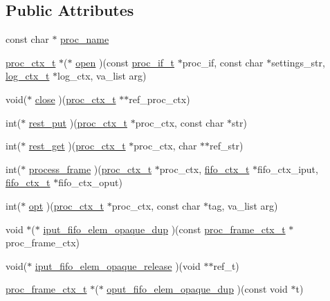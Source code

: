 \subsection*{Public Attributes}
\begin{DoxyCompactItemize}
\item 
const char $\ast$ \hyperlink{structproc__if__s_aa284f1d0bdde2fae0b51101f658430ee}{proc\+\_\+name}
\item 
\hyperlink{proc_8h_ae264f89be30fc03f5053bc16d58cba05}{proc\+\_\+ctx\+\_\+t} $\ast$($\ast$ \hyperlink{structproc__if__s_a34999576771394dfb721463c8455ba06}{open} )(const \hyperlink{proc_8h_a679816cf30e0b7a8f3e7464e67a6a844}{proc\+\_\+if\+\_\+t} $\ast$proc\+\_\+if, const char $\ast$settings\+\_\+str, \hyperlink{structlog__ctx__s}{log\+\_\+ctx\+\_\+t} $\ast$log\+\_\+ctx, va\+\_\+list arg)
\item 
void($\ast$ \hyperlink{structproc__if__s_af5971ac1d09d1c6ec3508c36fb286c19}{close} )(\hyperlink{proc_8h_ae264f89be30fc03f5053bc16d58cba05}{proc\+\_\+ctx\+\_\+t} $\ast$$\ast$ref\+\_\+proc\+\_\+ctx)
\item 
int($\ast$ \hyperlink{structproc__if__s_acb4d2c240c52904ebd6904f54b1a9b78}{rest\+\_\+put} )(\hyperlink{proc_8h_ae264f89be30fc03f5053bc16d58cba05}{proc\+\_\+ctx\+\_\+t} $\ast$proc\+\_\+ctx, const char $\ast$str)
\item 
int($\ast$ \hyperlink{structproc__if__s_afd94617c2897f8b3bcbd28d90bdf0ca1}{rest\+\_\+get} )(\hyperlink{proc_8h_ae264f89be30fc03f5053bc16d58cba05}{proc\+\_\+ctx\+\_\+t} $\ast$proc\+\_\+ctx, char $\ast$$\ast$ref\+\_\+str)
\item 
int($\ast$ \hyperlink{structproc__if__s_ab67b4061f94b6f15ae40c796b6b33597}{process\+\_\+frame} )(\hyperlink{proc_8h_ae264f89be30fc03f5053bc16d58cba05}{proc\+\_\+ctx\+\_\+t} $\ast$proc\+\_\+ctx, \hyperlink{structfifo__ctx__s}{fifo\+\_\+ctx\+\_\+t} $\ast$fifo\+\_\+ctx\+\_\+iput, \hyperlink{structfifo__ctx__s}{fifo\+\_\+ctx\+\_\+t} $\ast$fifo\+\_\+ctx\+\_\+oput)
\item 
int($\ast$ \hyperlink{structproc__if__s_a4ca0939d6721f368d2560851197fca36}{opt} )(\hyperlink{proc_8h_ae264f89be30fc03f5053bc16d58cba05}{proc\+\_\+ctx\+\_\+t} $\ast$proc\+\_\+ctx, const char $\ast$tag, va\+\_\+list arg)
\item 
void $\ast$($\ast$ \hyperlink{structproc__if__s_a558cec57df436699d4154775894f2313}{iput\+\_\+fifo\+\_\+elem\+\_\+opaque\+\_\+dup} )(const \hyperlink{structproc__frame__ctx__s}{proc\+\_\+frame\+\_\+ctx\+\_\+t} $\ast$proc\+\_\+frame\+\_\+ctx)
\item 
void($\ast$ \hyperlink{structproc__if__s_aec3bf948ff945ac2f5a4c834ea3b57da}{iput\+\_\+fifo\+\_\+elem\+\_\+opaque\+\_\+release} )(void $\ast$$\ast$ref\+\_\+t)
\item 
\hyperlink{structproc__frame__ctx__s}{proc\+\_\+frame\+\_\+ctx\+\_\+t} $\ast$($\ast$ \hyperlink{structproc__if__s_a7806bbda25988d9ee54f6d0bb143c697}{oput\+\_\+fifo\+\_\+elem\+\_\+opaque\+\_\+dup} )(const void $\ast$t)
\end{DoxyCompactItemize}


